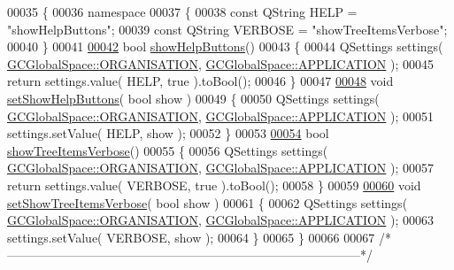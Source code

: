 \begin{DoxyCode}
00035 \{
00036   \textcolor{keyword}{namespace}
00037   \{
00038     \textcolor{keyword}{const} QString HELP = \textcolor{stringliteral}{"showHelpButtons"};
00039     \textcolor{keyword}{const} QString VERBOSE = \textcolor{stringliteral}{"showTreeItemsVerbose"};
00040   \}
00041 
\hypertarget{gcglobalspace_8cpp_source_l00042}{}\hyperlink{namespace_g_c_global_space_a981753e55f0f77f981f67ccb1ad4ecf1}{00042}   \textcolor{keywordtype}{bool} \hyperlink{namespace_g_c_global_space_a981753e55f0f77f981f67ccb1ad4ecf1}{showHelpButtons}()
00043   \{
00044     QSettings settings( \hyperlink{namespace_g_c_global_space_a97583835f9987b1c94ff05802ccfe42f}{GCGlobalSpace::ORGANISATION}, \hyperlink{namespace_g_c_global_space_ab53b9c3447f00f1cc45a1d3fdfbba564}{GCGlobalSpace::APPLICATION}
       );
00045     \textcolor{keywordflow}{return} settings.value( HELP, \textcolor{keyword}{true} ).toBool();
00046   \}
00047 
\hypertarget{gcglobalspace_8cpp_source_l00048}{}\hyperlink{namespace_g_c_global_space_a6395acc08160e411395f96a88793eacc}{00048}   \textcolor{keywordtype}{void} \hyperlink{namespace_g_c_global_space_a6395acc08160e411395f96a88793eacc}{setShowHelpButtons}( \textcolor{keywordtype}{bool} show )
00049   \{
00050     QSettings settings( \hyperlink{namespace_g_c_global_space_a97583835f9987b1c94ff05802ccfe42f}{GCGlobalSpace::ORGANISATION}, \hyperlink{namespace_g_c_global_space_ab53b9c3447f00f1cc45a1d3fdfbba564}{GCGlobalSpace::APPLICATION}
       );
00051     settings.setValue( HELP, show );
00052   \}
00053 
\hypertarget{gcglobalspace_8cpp_source_l00054}{}\hyperlink{namespace_g_c_global_space_ad9a35f311bda4dd28f5cf155c5efc818}{00054}   \textcolor{keywordtype}{bool} \hyperlink{namespace_g_c_global_space_ad9a35f311bda4dd28f5cf155c5efc818}{showTreeItemsVerbose}()
00055   \{
00056     QSettings settings( \hyperlink{namespace_g_c_global_space_a97583835f9987b1c94ff05802ccfe42f}{GCGlobalSpace::ORGANISATION}, \hyperlink{namespace_g_c_global_space_ab53b9c3447f00f1cc45a1d3fdfbba564}{GCGlobalSpace::APPLICATION}
       );
00057     \textcolor{keywordflow}{return} settings.value( VERBOSE, \textcolor{keyword}{true} ).toBool();
00058   \}
00059 
\hypertarget{gcglobalspace_8cpp_source_l00060}{}\hyperlink{namespace_g_c_global_space_a58bc4fea7a061440f9ef2dd0aca8aba5}{00060}   \textcolor{keywordtype}{void} \hyperlink{namespace_g_c_global_space_a58bc4fea7a061440f9ef2dd0aca8aba5}{setShowTreeItemsVerbose}( \textcolor{keywordtype}{bool} show )
00061   \{
00062     QSettings settings( \hyperlink{namespace_g_c_global_space_a97583835f9987b1c94ff05802ccfe42f}{GCGlobalSpace::ORGANISATION}, \hyperlink{namespace_g_c_global_space_ab53b9c3447f00f1cc45a1d3fdfbba564}{GCGlobalSpace::APPLICATION}
       );
00063     settings.setValue( VERBOSE, show );
00064   \}
00065 \}
00066 
00067 \textcolor{comment}{/*
      --------------------------------------------------------------------------------------*/}
\end{DoxyCode}
